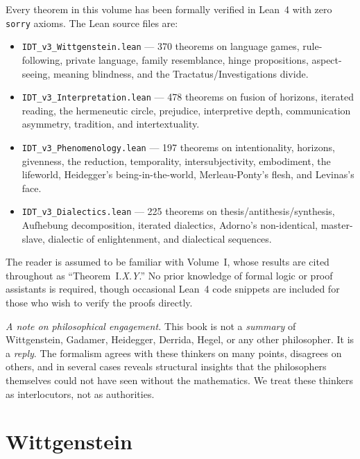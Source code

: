\documentclass[11pt,oneside]{book}
\theoremstyle{plain}
\theoremstyle{definition}
\theoremstyle{remark}
\begin{document}
Every theorem in this volume has been formally verified in Lean~4 with zero
\texttt{sorry} axioms. The Lean source files are:
\begin{itemize}
\item \texttt{IDT\_v3\_Wittgenstein.lean} --- 370 theorems on language games,
rule-following, private language, family resemblance, hinge propositions,
aspect-seeing, meaning blindness, and the Tractatus/Investigations divide.

\item \texttt{IDT\_v3\_Interpretation.lean} --- 478 theorems on fusion of
horizons, iterated reading, the hermeneutic circle, prejudice, interpretive
depth, communication asymmetry, tradition, and intertextuality.

\item \texttt{IDT\_v3\_Phenomenology.lean} --- 197 theorems on intentionality,
horizons, givenness, the reduction, temporality, intersubjectivity,
embodiment, the lifeworld, Heidegger's being-in-the-world, Merleau-Ponty's
flesh, and Levinas's face.

\item \texttt{IDT\_v3\_Dialectics.lean} --- 225 theorems on thesis/antithesis/synthesis,
Aufhebung decomposition, iterated dialectics, Adorno's non-identical,
master-slave, dialectic of enlightenment, and dialectical sequences.
\end{itemize}

The reader is assumed to be familiar with Volume~I, whose results are
cited throughout as ``Theorem~I.\emph{X.Y}.'' No prior knowledge of
formal logic or proof assistants is required, though occasional Lean~4
code snippets are included for those who wish to verify the proofs
directly.

\vspace{1em}
\noindent\textit{A note on philosophical engagement.} This book is not a
\emph{summary} of Wittgenstein, Gadamer, Heidegger, Derrida, Hegel, or
any other philosopher. It is a \emph{reply}. The formalism agrees with
these thinkers on many points, disagrees on others, and in several cases
reveals structural insights that the philosophers themselves could not have
seen without the mathematics. We treat these thinkers as interlocutors,
not as authorities.

\tableofcontents

\mainmatter

\part{Wittgenstein}
\end{document}
